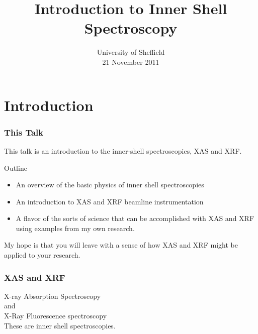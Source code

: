\documentclass[10pt, xcolor=x11names, compress]{beamer}
\title{Introduction to Inner Shell Spectroscopy}
\date{University of Sheffield\\21 November 2011}
\begin{document}
\maketitle


\section[Introduction]{Introduction}

\begin{frame}
  \frametitle{This Talk}
  
  This talk is an introduction to the inner-shell spectroscopies, XAS
  and XRF.

  \bigskip

  \begin{block}{Outline}
    \begin{itemize}
    \item An overview of the basic physics of inner shell spectroscopies
    \item An introduction to XAS and XRF beamline instrumentation
    \item A flavor of the sorts of science that can be accomplished
      with XAS and XRF using examples from my own research.
    \end{itemize}
  \end{block}

  \bigskip

  My hope is that you will leave with a sense of how XAS and XRF might
  be applied to \alert{your} research.
\end{frame}

\begin{frame}
  \frametitle{XAS and XRF}

  \begin{center}
    \Large
    \alert{X}-ray \alert{A}bsorption \alert{S}pectroscopy\\
    and\\
    \alert{X}-\alert{R}ay \alert{F}luorescence spectroscopy\\[3ex]
    These are {\color{Firebrick4}inner shell}
    {\color{Purple4}spectroscopies}.
  \end{center}

  \begin{columns}[T]
    \begin{column}{0.5\linewidth}
    \end{column}
    \begin{column}{0.5\linewidth}
    \end{column}
  \end{columns}
\end{frame}
\end{document}
